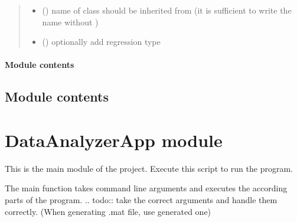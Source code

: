 \documentclass[letterpaper,10pt,english]{sphinxmanual}
\begin{document}
\begin{fulllineitems}
\begin{quote}
\begin{description}
\begin{itemize}
\item {} 
 () \textendash{} name of class  should be inherited from
(it is sufficient to write the name without )

\item {} 
 () \textendash{} optionally add regression type

\end{itemize}

\end{description}\end{quote}

\end{fulllineitems}



\paragraph{Module contents}
\label{\detokenize{DataAnalyzer.PlotConfig:module-DataAnalyzer.PlotConfig}}\label{\detokenize{DataAnalyzer.PlotConfig:module-contents}}

\subsection{Module contents}
\label{\detokenize{DataAnalyzer:module-DataAnalyzer}}\label{\detokenize{DataAnalyzer:module-contents}}

\section{DataAnalyzerApp module}
\label{\detokenize{DataAnalyzerApp:module-DataAnalyzerApp}}\label{\detokenize{DataAnalyzerApp:dataanalyzerapp-module}}\label{\detokenize{DataAnalyzerApp::doc}}
This is the main module of the project. Execute this script to run the program.

\begin{fulllineitems}
\label{\detokenize{DataAnalyzerApp:DataAnalyzerApp.main}}
The main function takes command line arguments and executes the according parts of the program.
.. todo:: take the correct arguments and handle them correctly. (When generating .mat file, use generated one)

\end{fulllineitems}
\end{document}
